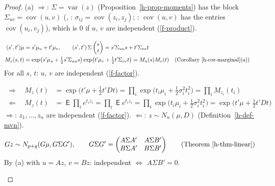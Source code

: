 \documentclass[12pt]{article}
\newcommand{\R}{\mathbb R}
\DeclareMathOperator\expc{\mathsf{E}}
\DeclareMathOperator\var{var}
\DeclareMathOperator\cov{cov}
\theoremstyle{definition}
\newcommand{\boardtop}{\vspace*{-\abovedisplayskip}}
\begin{document}
\begin{proof}
(a) \(\Rightarrow\): \(\Sigma=\var(z)\) (Proposition~\ref{h-prop-moments}) has the block \(\Sigma_{uv}=\cov(u,v)\)
(, : \(\sigma_{ij}=\cov(z_i,z_j)\); : \(\cov(u,v)\) has the entries \(\cov(u_i,v_j)\)),
which is \(0\) if \(u\), \(v\) are independent (\ref{f-product}).
\begin{board}[(a) \(\Leftarrow\): \(\Sigma_{uv}=0\), so \(\Sigma_{vu}=\Sigma_{uv}'=0\); for \(s\in\R^p\), \(t\in\R^q\), by
blocks (\lec{5}, \lit{Theorem~2}(c): blocks multiply block by block):]
\boardtop
\begin{align*}
(s',t')\mu&=s'\mu_u+t'\mu_v,\qquad(s',t')\,\Sigma\begin{pmatrix}s\\t\end{pmatrix}=s'\Sigma_{uu}s+t'\Sigma_{vv}t\\
M_z(s,t)&=\exp\bigl(s'\mu_u+\tfrac12s'\Sigma_{uu}s\bigr)\exp\bigl(t'\mu_v+\tfrac12t'\Sigma_{vv}t\bigr)=M_u(s)M_v(t)
&&\text{(Corollary~\ref{h-cor-marginal}(a))}
\end{align*}
For all \(s\), \(t\): \(u\), \(v\) are independent (\ref{f-factor}).
\end{board}
\begin{board}[(b) \(t'Dt=\sum_i\sigma_i^2t_i^2\) (\lec{1}, \lit{Proposition~13}(a), \lit{Theorem~8}), so \(D\) is PSD;
\(\Rightarrow\) uses \(z_i\sim N(\mu_i,\sigma_i^2)\) (Corollary~\ref{h-cor-marginal}(a)), \(\Leftarrow\) uses
\ref{f-product}; for all \(t\in\R^n\):]
\boardtop
\begin{align*}
\Rightarrow\quad M_z(t)&=\exp\bigl(t'\mu+\tfrac12t'Dt\bigr)=\textstyle\prod_i\exp\bigl(t_i\mu_i+\tfrac12\sigma_i^2t_i^2\bigr)=\prod_iM_{z_i}(t_i)\\
\Leftarrow\quad M_z(t)&=\expc\textstyle\prod_ie^{t_iz_i}=\prod_i\expc e^{t_iz_i}=\prod_i\exp\bigl(t_i\mu_i+\tfrac12\sigma_i^2t_i^2\bigr)=\exp\bigl(t'\mu+\tfrac12t'Dt\bigr)
\end{align*}
\(\Rightarrow\): \(z_1,\dots,z_n\) are independent (\ref{f-factor}). \(\Leftarrow\): \(z\sim N_n(\mu,D)\)
(Definition~\ref{h-def-mvn}).
\end{board}
\begin{board}[(c) \(G=\left(\begin{smallmatrix}A\\B\end{smallmatrix}\right)\in\R^{(p+q)\times n}\),
\(Gz=\bigl((Az)',(Bz)'\bigr)'\); blocks (\lec{5}, \lit{Theorem~2}(b),(c): transposed and multiplied block by
block):]
\[
Gz\sim N_{p+q}(G\mu,G\Sigma G'),\qquad G\Sigma G'=\begin{pmatrix}A\Sigma A'&A\Sigma B'\\B\Sigma A'&B\Sigma B'\end{pmatrix}
\qquad\text{(Theorem~\ref{h-thm-linear})}
\]
By (a) with \(u=Az\), \(v=Bz\): independent \(\iff\) \(A\Sigma B'=0\).
\end{board}
\nopagebreak
\end{proof}
\end{document}
